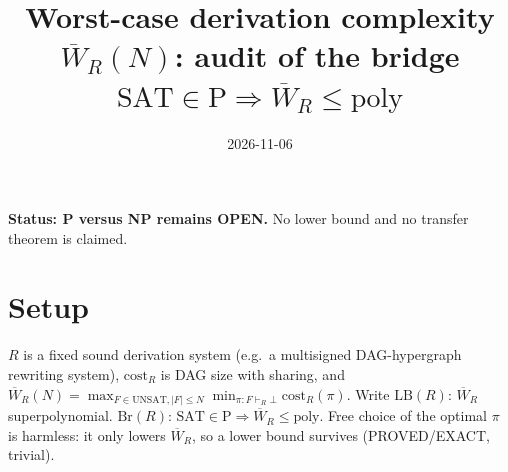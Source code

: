 \documentclass{article}\usepackage{amsmath,amssymb,amsthm}
\title{Worst-case derivation complexity $\overline W_R(N)$: audit of the bridge $\mathrm{SAT}\in\mathrm P\Rightarrow\overline W_R\le\mathrm{poly}$}
\date{2026-11-06}
\begin{document}
\maketitle
\noindent\textbf{Status: P versus NP remains OPEN.} No lower bound and no transfer theorem is claimed.

\section*{Setup}
$R$ is a fixed sound derivation system (e.g.\ a multisigned DAG-hypergraph rewriting system), $\mathrm{cost}_R$ is DAG size with sharing, and
$\overline W_R(N)=\max_{F\in\mathrm{UNSAT},|F|\le N}\min_{\pi:F\vdash_R\bot}\mathrm{cost}_R(\pi)$.
Write $\mathrm{LB}(R)$: $\overline W_R$ superpolynomial. $\mathrm{Br}(R)$: $\mathrm{SAT}\in\mathrm P\Rightarrow\overline W_R\le\mathrm{poly}$.
Free choice of the optimal $\pi$ is harmless: it only lowers $\overline W_R$, so a lower bound survives (PROVED/EXACT, trivial).
\end{document}
